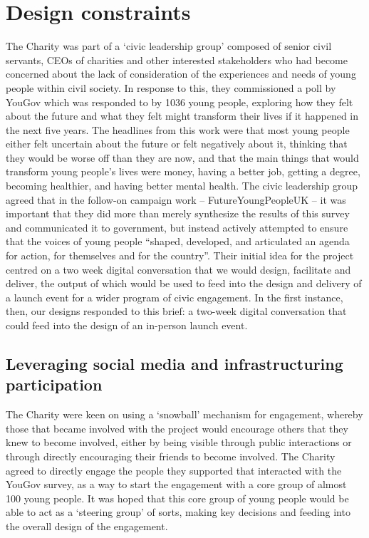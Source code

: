 \section{Design constraints}
The Charity was part of a ‘civic leadership group’ composed of senior civil servants, CEOs of charities and other interested stakeholders who had become concerned about the lack of consideration of the experiences and needs of young people within civil society. In response to this, they commissioned a poll by YouGov which was responded to by 1036 young people, exploring how they felt about the future and what they felt might transform their lives if it happened in the next five years. The headlines from this work were that most young people either felt uncertain about the future or felt negatively about it, thinking that they would be worse off than they are now, and that the main things that would transform young people’s lives were money, having a better job, getting a degree, becoming healthier, and having better mental health.  The civic leadership group agreed that in the follow-on campaign work – FutureYoungPeopleUK – it was important that they did more than merely synthesize the results of this survey and communicated it to government, but instead actively attempted to ensure that the voices of young people “shaped, developed, and articulated an agenda for action, for themselves and for the country”. Their initial idea for the project centred on a two week digital conversation that we would design, facilitate and deliver, the output of which would be used to feed into the design and delivery of a launch event for a wider program of civic engagement.  In the first instance, then, our designs responded to this brief: a two-week digital conversation that could feed into the design of an in-person launch event.

\subsection{Leveraging social media and infrastructuring participation}

The Charity were keen on using a ‘snowball’ mechanism for engagement, whereby those that became involved with the project would encourage others that they knew to become involved, either by being visible through public interactions or through directly encouraging their friends to become involved. The Charity agreed to directly engage the people they supported that interacted with the YouGov survey, as a way to start the engagement with a core group of almost 100 young people. It was hoped that this core group of young people would be able to act as a ‘steering group’ of sorts, making key decisions and feeding into the overall design of the engagement.

